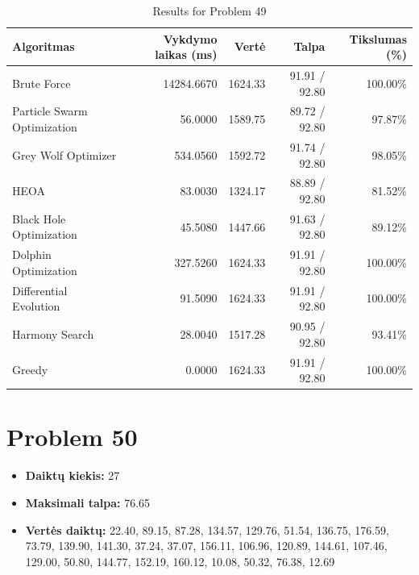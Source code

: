 \documentclass[a4paper,11pt]{article}
\begin{document}
\begin{table}[h!]
\centering
\begin{tabular}{lrrrr}
\toprule
\textbf{Algoritmas} & \textbf{Vykdymo laikas (ms)} & \textbf{Vertė} & \textbf{Talpa} & \textbf{Tikslumas (\%)} \\
\midrule
Brute Force & 14284.6670 & 1624.33 & 91.91 / 92.80 & 100.00\% \\
Particle Swarm Optimization & 56.0000 & 1589.75 & 89.72 / 92.80 & 97.87\% \\
Grey Wolf Optimizer & 534.0560 & 1592.72 & 91.74 / 92.80 & 98.05\% \\
HEOA & 83.0030 & 1324.17 & 88.89 / 92.80 & 81.52\% \\
Black Hole Optimization & 45.5080 & 1447.66 & 91.63 / 92.80 & 89.12\% \\
Dolphin Optimization & 327.5260 & 1624.33 & 91.91 / 92.80 & 100.00\% \\
Differential Evolution & 91.5090 & 1624.33 & 91.91 / 92.80 & 100.00\% \\
Harmony Search & 28.0040 & 1517.28 & 90.95 / 92.80 & 93.41\% \\
Greedy & 0.0000 & 1624.33 & 91.91 / 92.80 & 100.00\% \\
\bottomrule
\end{tabular}
\caption{Results for Problem 49}
\end{table}
\clearpage

\section*{Problem 50}
\begin{itemize}
    \item \textbf{Daiktų kiekis:} 27
    \item \textbf{Maksimali talpa:} 76.65
    \item \textbf{Vertės daiktų:} 22.40, 89.15, 87.28, 134.57, 129.76, 51.54, 136.75, 176.59, 73.79, 139.90, 141.30, 37.24, 37.07, 156.11, 106.96, 120.89, 144.61, 107.46, 129.00, 50.80, 144.77, 152.19, 160.12, 10.08, 50.32, 76.38, 12.69
\end{itemize}
\end{document}
